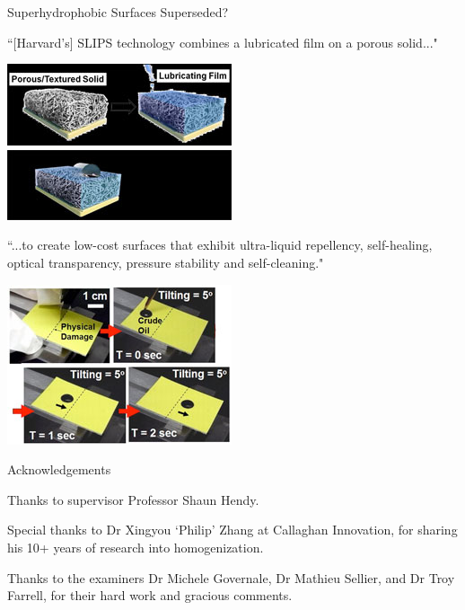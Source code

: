 \documentclass{beamer}
\begin{document}
\begin{frame}{Superhydrophobic Surfaces Superseded?}


``[Harvard's] SLIPS technology combines a lubricated film on a porous solid..."
\begin{center}
\includegraphics[scale=0.5]{slips-1a-250x91.jpg}
\phantom{word}
\includegraphics[scale=0.5]{slips-1b-250x78.jpg}
\end{center}

``...to create low-cost surfaces that exhibit ultra-liquid repellency, self-healing, optical transparency, pressure stability and self-cleaning."

\begin{center}
\includegraphics[scale=0.5]{slips-2-250x178.jpg}
\end{center}

\end{frame}


\begin{frame}{Acknowledgements}

Thanks to supervisor Professor Shaun Hendy.

\vspace{1em}
Special thanks to Dr Xingyou `Philip' Zhang at Callaghan Innovation,
for sharing his 10+ years of research into homogenization.

\vspace{1em}
Thanks to the examiners Dr Michele Governale, Dr Mathieu Sellier, and Dr Troy Farrell, for their hard work and gracious comments.

\end{frame}
\end{document}
